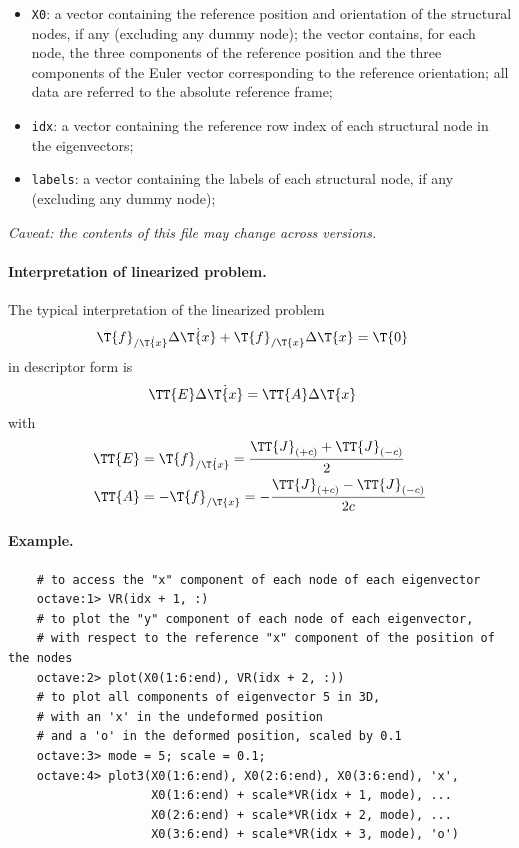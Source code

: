 \begin{itemize}
\item \texttt{X0}: a vector containing the reference position
and orientation of the structural nodes, if any (excluding any dummy node);
the vector contains, for each node, the three components
of the reference position and the three components of the Euler vector
corresponding to the reference orientation; all data are referred
to the absolute reference frame;

\item \texttt{idx}: a vector containing the reference row index
  of each structural node in the eigenvectors;

\item \texttt{labels}: a vector containing the labels of each structural node, if any (excluding any dummy node);
\end{itemize}

\emph{Caveat: the contents of this file may change across versions.}

\paragraph{Interpretation of linearized problem.}
The typical interpretation of the linearized problem
\begin{align}
	\T{f}_{/\dot{\T{x}}} \Delta\dot{\T{x}} + \T{f}_{/\T{x}} \Delta\T{x} &= \T{0}
\end{align}
in descriptor form is
\begin{align}
	\TT{E} \Delta\dot{\T{x}} &= \TT{A} \Delta\T{x}
\end{align}
with
\begin{subequations}
\begin{align}
	\TT{E} &= \T{f}_{/\dot{\T{x}}} = \frac{\TT{J}_{(+c)} + \TT{J}_{(-c)}}{2}
	\\
	\TT{A} &= - \T{f}_{/\T{x}} = - \frac{\TT{J}_{(+c)} - \TT{J}_{(-c)}}{2 c}
\end{align}
\end{subequations}


\paragraph{Example.}
\begin{verbatim}
    # to access the "x" component of each node of each eigenvector
    octave:1> VR(idx + 1, :)
    # to plot the "y" component of each node of each eigenvector,
    # with respect to the reference "x" component of the position of the nodes
    octave:2> plot(X0(1:6:end), VR(idx + 2, :))
    # to plot all components of eigenvector 5 in 3D,
    # with an 'x' in the undeformed position
    # and a 'o' in the deformed position, scaled by 0.1
    octave:3> mode = 5; scale = 0.1;
    octave:4> plot3(X0(1:6:end), X0(2:6:end), X0(3:6:end), 'x',
                    X0(1:6:end) + scale*VR(idx + 1, mode), ...
                    X0(2:6:end) + scale*VR(idx + 2, mode), ...
                    X0(3:6:end) + scale*VR(idx + 3, mode), 'o')
\end{verbatim}




